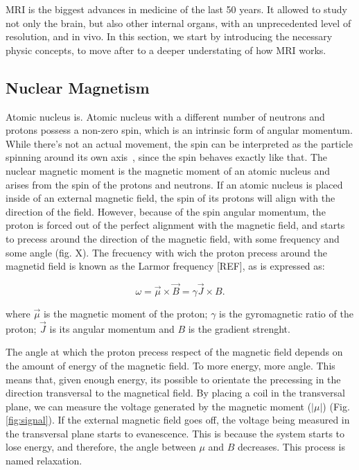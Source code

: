 MRI is the biggest advances in medicine of the last 50 years. It allowed to
study not only the brain, but also other internal organs, with an unprecedented
level of resolution, and in vivo. In this section, we start by introducing the
necessary physic concepts, to move after to a deeper understating of how MRI
works.

\subsection{Nuclear Magnetism}
Atomic nucleus is.
Atomic nucleus with a different number of neutrons and protons possess a non-zero spin, which is an intrinsic form of angular momentum.
While there's not an actual movement, the spin can be interpreted as the particle spinning around its own axis~\cite{SEGALA1993}, since the spin behaves exactly like that.
The nuclear magnetic moment is the magnetic moment of an atomic nucleus and arises from the spin of the protons and neutrons.
If an atomic nucleus is placed inside of an external magnetic field, the spin of its protons will align with the direction of the field.
However, because of the spin angular momentum, the proton is forced out of the perfect alignment with the magnetic field, and starts to precess around the direction of the magnetic field, with some frequency and some angle (fig. X).
The frecuency with wich the proton precess around the magnetid field is known as the Larmor frequency [REF], as is expressed as:

\begin{equation}
    \label{eq:larmor}
    \omega = \vec{\mu} \times \vec{B} = \gamma \vec{J} \times B.
\end{equation}

where $\vec{\mu}$ is the magnetic moment of the proton;
$\gamma$ is the gyromagnetic ratio of the proton;
$\vec{J}$ is its angular momentum and $B$ is the gradient strenght.

The angle at which the proton precess respect of the magnetic field depends on the amount of energy of the magnetic field.
To more energy, more angle.
This means that, given enough energy, its possible to orientate the precessing in the direction transversal to the magnetical field.
By placing a coil in the transversal plane, we can measure the voltage generated by the magnetic moment ($|\mu|$) (Fig. \ref{fig:signal}).
If the external magnetic field goes off, the voltage being measured in the transversal plane starts to evanescence.
This is because the system starts to lose energy, and therefore, the angle between $\mu$ and $B$ decreases.
This process is named relaxation.


